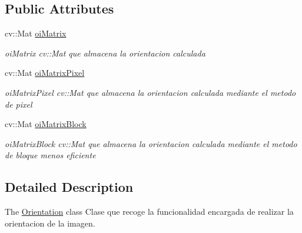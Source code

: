 \subsection*{Public Attributes}
\begin{DoxyCompactItemize}
\item 
\hypertarget{class_orientation_a3bf906cb5bae4d9cfcb99512bb348086}{cv\+::\+Mat \hyperlink{class_orientation_a3bf906cb5bae4d9cfcb99512bb348086}{oi\+Matrix}}\label{class_orientation_a3bf906cb5bae4d9cfcb99512bb348086}

\begin{DoxyCompactList}\small\item\em oi\+Matrix cv\+::\+Mat que almacena la orientacion calculada \end{DoxyCompactList}\item 
\hypertarget{class_orientation_a2ea4cd6254ecfb1123db119cdfad38a3}{cv\+::\+Mat \hyperlink{class_orientation_a2ea4cd6254ecfb1123db119cdfad38a3}{oi\+Matrix\+Pixel}}\label{class_orientation_a2ea4cd6254ecfb1123db119cdfad38a3}

\begin{DoxyCompactList}\small\item\em oi\+Matrix\+Pixel cv\+::\+Mat que almacena la orientacion calculada mediante el metodo de pixel \end{DoxyCompactList}\item 
\hypertarget{class_orientation_af2d86f34c6597d55149fb729ef02c587}{cv\+::\+Mat \hyperlink{class_orientation_af2d86f34c6597d55149fb729ef02c587}{oi\+Matrix\+Block}}\label{class_orientation_af2d86f34c6597d55149fb729ef02c587}

\begin{DoxyCompactList}\small\item\em oi\+Matrix\+Block cv\+::\+Mat que almacena la orientacion calculada mediante el metodo de bloque menos eficiente \end{DoxyCompactList}\end{DoxyCompactItemize}


\subsection{Detailed Description}
The \hyperlink{class_orientation}{Orientation} class Clase que recoge la funcionalidad encargada de realizar la orientacion de la imagen. 

